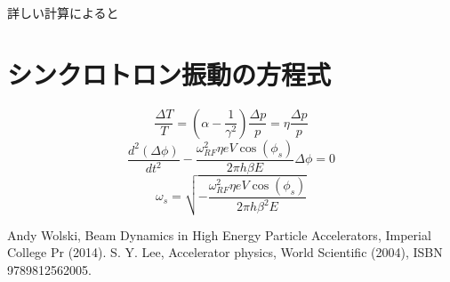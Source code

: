 \documentclass[10pt,a4paper]{ltjsarticle}
\begin{document}
詳しい計算によると

\section{シンクロトロン振動の方程式}
%
\begin{equation}
  \frac{\Delta T}{T}=\left(\alpha - \frac{1}{\gamma^2}\right)\frac{\Delta p}{p}=\eta\frac{\Delta p}{p}
  \label{eq20}
\end{equation}
%
\begin{equation}
  \frac{d^2(\Delta\phi)}{dt^2}-\frac{\omega_{RF}^2\eta e V\cos(\phi_s)}{2\pi h \beta E}\Delta\phi = 0
  \label{eq21}
\end{equation}
%
\begin{equation}
  \omega_s = \sqrt{-\frac{\omega_{RF}^2\eta e V \cos(\phi_s)}{2\pi h \beta^2 E}}
  \label{eq22}
\end{equation}
%
\begin{thebibliography}{99}
  Andy Wolski, Beam Dynamics in High Energy Particle Accelerators,  Imperial College Pr (2014).
  S. Y. Lee, Accelerator physics, World Scientific (2004), ISBN 9789812562005.
\end{thebibliography}
%
\end{document}
